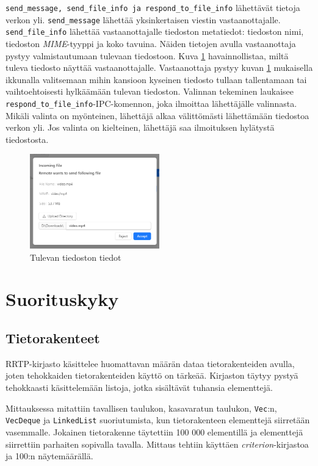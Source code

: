 \documentclass[a4paper,12pt]{article}
\begin{document}
    \lstinline{send_message, send_file_info ja respond_to_file_info} lähettävät tietoja verkon yli. \lstinline{send_message} lähettää yksinkertaisen viestin vastaanottajalle.
    \lstinline{send_file_info} lähettää vastaanottajalle tiedoston metatiedot: tiedoston nimi, tiedoston \textit{MIME}-tyyppi ja koko tavuina. Näiden tietojen avulla vastaanottaja pystyy valmistautumaan tulevaan tiedostoon. Kuva \ref{fig:incoming_file} havainnollistaa, miltä tuleva tiedosto näyttää vastaanottajalle. Vastaanottaja pystyy kuvan \ref{fig:incoming_file} mukaisella ikkunalla valitsemaan mihin kansioon kyseinen tiedosto tullaan tallentamaan tai vaihtoehtoisesti hylkäämään tulevan tiedoston. Valinnan tekeminen laukaisee \lstinline{respond_to_file_info}-IPC-komennon, joka ilmoittaa lähettäjälle valinnasta.
    Mikäli valinta on myönteinen, lähettäjä alkaa välittömästi lähettämään tiedostoa verkon yli. Jos valinta on kielteinen, lähettäjä saa ilmoituksen hylätystä tiedostosta.

    \begin{figure}[h!]
        \centering
        \includegraphics[width=0.5\textwidth]{doc/latex/src/images/incoming_file.png}
        \caption{Tulevan tiedoston tiedot}
        \label{fig:incoming_file}
    \end{figure}

    \section{Suorituskyky}\label{sec:suorityskyky}

    \subsection{Tietorakenteet}\label{sec:structures}
    RRTP-kirjasto käsittelee huomattavan määrän dataa tietorakenteiden avulla, joten tehokkaiden tietorakenteiden käyttö on tärkeää. Kirjaston täytyy pystyä tehokkaasti käsittelemään listoja, jotka sisältävät tuhansia elementtejä. \par
    Mittauksessa mitattiin tavallisen taulukon, kasavaratun taulukon,
    \lstinline{Vec}:n, \lstinline{VecDeque} ja \lstinline{LinkedList} suoriutumista, kun tietorakenteen elementtejä siirretään vasemmalle. Jokainen tietorakenne täytettiin 100 000 elementillä ja elementtejä siirrettiin parhaiten sopivalla tavalla.
    Mittaus tehtiin käyttäen \textit{criterion}-kirjastoa ja 100:n näytemäärällä.
\end{document}
